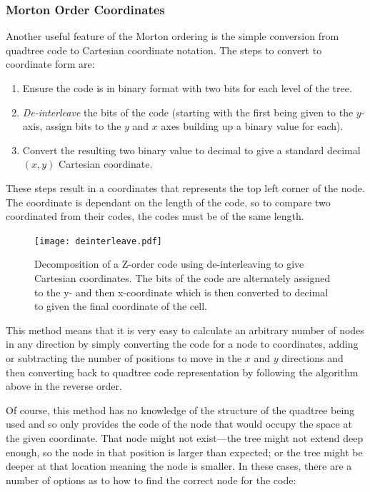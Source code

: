 \subsubsection*{Morton Order Coordinates}
\label{ssub:morton_order_coordinates}

Another useful feature of the Morton ordering is the simple conversion from
quadtree code to Cartesian coordinate notation. The steps to convert to
coordinate form are:

\begin{enumerate}
	\item Ensure the code is in binary format with two bits for each level of
		the tree.
	\item \emph{De-interleave} the bits of the code (starting with the first
		being given to the $y$-axis, assign bits to the $y$ and $x$ axes
		building up a binary value for each).
	\item Convert the resulting two binary value to decimal to give a standard
		decimal $(x,y)$ Cartesian coordinate.
\end{enumerate}

These steps result in a coordinates that represents the top left corner of the
node. The coordinate is dependant on the length of the code, so to compare two
coordinated from their codes, the codes must be of the same length.

\begin{figure}[tbhp]
	\centering
	\texttt{[image: deinterleave.pdf]}

	\caption[Decomposition of a Z-order code to give coordinates.]{Decomposition
		of a Z-order code using de-interleaving to give Cartesian coordinates.
		The bits of the code are alternately assigned to the y- and then
		x-coordinate which is then converted to decimal to given the final
		coordinate of the cell.}\label{fig:deinterleave}
\end{figure}

This method means that it is very easy to calculate an arbitrary number of
nodes in any direction by simply converting the code for a node to coordinates,
adding or subtracting the number of positions to move in the $x$ and $y$
directions and then converting back to quadtree code representation by
following the algorithm above in the reverse order.

Of course, this method has no knowledge of the structure of the quadtree being
used and so only provides the code of the node that would occupy the space at
the given coordinate. That node might not exist---the tree might not extend
deep enough, so the node in that position is larger than expected; or the tree
might be deeper at that location meaning the node is smaller. In these cases,
there are a number of options as to how to find the correct node for the code:

